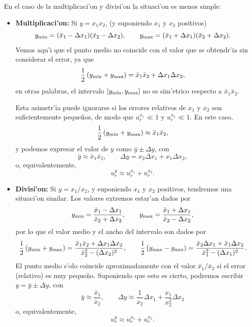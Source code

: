 En el caso de la multiplicaci'on y divisi'on la situaci'on es menos simple:
\begin{itemize}
\item \textbf{Multiplicaci'on:} Si $y=x_1 x_2$, (y suponiendo $x_1$ y $x_2$ positivos)
\begin{equation}
y_{\rm min} = (\bar{x}_1-\Delta x_1)(\bar{x}_2-\Delta x_2), \qquad 
y_{\rm max} = (\bar{x}_1+\Delta x_1)(\bar{x}_2+\Delta x_2).
\end{equation}
Vemos aqu'i que el punto medio no coincide con el valor que se obtendr'ia sin considerar el error, ya que
\begin{equation}
\frac{1}{2}\left(y_{\rm min}+y_{\rm max}\right) = \bar{x}_1\bar{x}_2+\Delta x_1\Delta x_2,
\end{equation}
en otras palabras, el intervalo $[y_{\rm min},y_{\rm max}]$ no es sim'etrico respecto a $\bar{x}_1\bar{x}_2$.

Esta asimetr'ia puede ignorarse si los errores relativos de $x_1$ y $x_2$ son suficientemente peque\~nos, de modo que $u_r^{x_1}\ll 1$ y $u_r^{x_2}\ll 1$. En este caso,
\begin{equation}
\frac{1}{2}\left(y_{\rm min}+y_{\rm max}\right) \approx \bar{x}_1\bar{x}_2,
\end{equation}
y podemos expresar el valor de $y$ como $\bar{y}\pm\Delta y$, con
\begin{equation}
\bar{y} \approx \bar{x}_1\bar{x}_2, \qquad  \Delta y= x_2\Delta x_1 + x_1\Delta x_2 , 
\end{equation}
o, equivalentemente,
\begin{equation}
u_r^{y} \approx u_r^{x_1} + u_r^{x_2}.
\end{equation}

\item \textbf{Divisi'on:} Si $y=x_1/x_2$, y suponiendo $x_1$ y $x_2$ positivos, tendremos una situaci'on similar. Los valores extremos estar'an dados por
\begin{equation}
y_{\rm min} = \frac{\bar{x}_1-\Delta x_1}{\bar{x}_2+\Delta x_2}, \qquad 
y_{\rm max} = \frac{\bar{x}_1+\Delta x_1}{\bar{x}_2-\Delta x_2},
\end{equation}
por lo que el valor medio y el ancho del intervalo son dados por
\begin{equation}
\frac{1}{2}\left(y_{\rm min}+y_{\rm max}\right) = \frac{\bar{x}_1\bar{x}_2+\Delta x_1\Delta x_2}{\bar{x}_2^2-(\Delta x_2)^2}, 
\qquad \frac{1}{2}\left(y_{\rm max}-y_{\rm min}\right) = \frac{\bar{x}_2\Delta x_1 + \bar{x}_1\Delta x_2}{\bar{x}_1^2-(\Delta x_1)^2}.
\end{equation}
El punto medio s'olo coincide aproximadamente con el valor $\bar{x}_1/\bar{x}_2$ si el error (relativo) es muy peque\~no. Suponiendo que esto es cierto, podremos escribir $y = \bar{y}\pm\Delta y$, con
\begin{equation}
\bar{y}\approx \frac{\bar{x}_1}{\bar{x}_2}, \qquad  \Delta y \approx \frac{1}{x_2}\Delta x_1 + \frac{x_1}{x_2^2}\Delta x_2
\end{equation}
o, equivalentemente,
\begin{equation}
u_r^{y} \approx  u_r^{x_1} + u_r^{x_2}.
\end{equation}


\end{itemize}
